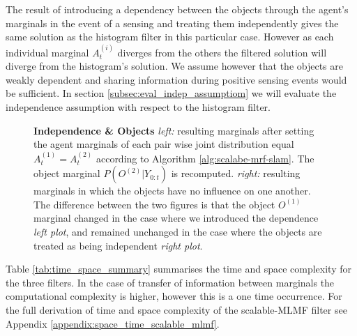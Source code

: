 The result of introducing a dependency between the objects through the agent's marginals in the event of a sensing and treating them
independently gives the same solution as the histogram filter in this particular case. However as each individual marginal $A^{(i)}_t$ diverges 
from the others the filtered solution will diverge from the histogram's solution. We assume however that the objects are weakly dependent 
and sharing information during positive sensing events would be sufficient. In section \ref{subsec:eval_indep_assumptiom} we will 
evaluate the independence assumption with respect to the histogram filter.

\begin{figure}
  \centering
  \caption{\textbf{Independence \& Objects} \textit{left:} resulting marginals after setting the agent marginals of each pair wise joint distribution
  equal $A^{(1)}_t = A^{(2)}_t$ according to Algorithm \ref{alg:scalabe-mrf-slam}. The object marginal $P(O^{(2)}|Y_{0:t})$ is recomputed. 
  \textit{right:} resulting marginals in which the objects have no influence on one another. The difference
   between the two figures is that the object $O^{(1)}$ marginal changed in the case where we introduced the dependence \textit{left plot}, and remained 
  unchanged in the case where the objects are treated as being independent \textit{right plot}.}
  \label{fig:independence_object}
\end{figure}

Table \ref{tab:time_space_summary} summarises the time and space complexity for the three filters. In the case of transfer of
information between marginals the computational complexity is higher, however this is a one time occurrence. For the full derivation of
time and space complexity of the scalable-MLMF filter see Appendix \ref{appendix:space_time_scalable_mlmf}.

